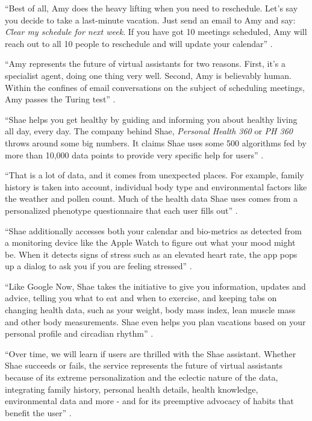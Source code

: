 ``Best of all, Amy does the heavy lifting when you need to reschedule. Let's say you decide to take a last-minute vacation. Just send an email to Amy and say: {\em Clear my schedule for next week}. If you have got 10 meetings scheduled, Amy will reach out to all 10 people to reschedule and will update your calendar'' \cite{Elgan2016future}.

``Amy represents the future of virtual assistants for two reasons. First, it's a specialist agent, doing one thing very well. Second, Amy is believably human. Within the confines of email conversations on the subject of scheduling meetings, Amy passes the Turing test'' \cite{Elgan2016future}.

``Shae helps you get healthy by guiding and informing you about healthy living all day, every day. The company behind Shae, {\em Personal Health 360} or {\em PH 360} throws around some big numbers. It claims Shae uses some 500 algorithms fed by more than 10,000 data points to provide very specific help for users'' \cite{Elgan2016future}.

``That is a lot of data, and it comes from unexpected places. For example, family history is taken into account, individual body type and environmental factors like the weather and pollen count. Much of the health data Shae uses comes from a personalized phenotype questionnaire that each user fills out'' \cite{Elgan2016future}.

``Shae additionally accesses both your calendar and bio-metrics as detected from a monitoring device like the Apple Watch to figure out what your mood might be. When it detects signs of stress such as an elevated heart rate, the app pops up a dialog to ask you if you are feeling stressed'' \cite{Elgan2016future}.

``Like Google Now, Shae takes the initiative to give you information, updates and advice, telling you what to eat and when to exercise, and keeping tabs on changing health data, such as your weight, body mass index, lean muscle mass and other body measurements. Shae even helps you plan vacations based on your personal profile and circadian rhythm'' \cite{Elgan2016future}.

``Over time, we will learn if users are thrilled with the Shae assistant. Whether Shae succeeds or fails, the service represents the future of virtual assistants because of its extreme personalization and the eclectic nature of the data, integrating family history, personal health details, health knowledge, environmental data and more - and for its preemptive advocacy of habits that benefit the user'' \cite{Elgan2016future}.

